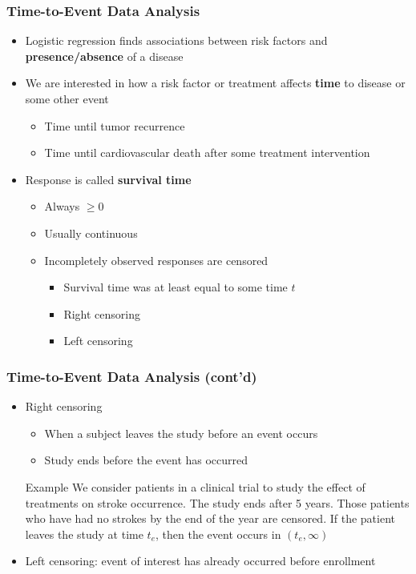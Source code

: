 \documentclass[usenames,dvipsnames]{beamer}
\begin{document}
\begin{frame}
  \frametitle{Time-to-Event Data Analysis}
  \begin{itemize}
    \item Logistic regression finds associations between risk factors and
    \textbf{presence/absence} of a disease
    \item We are interested in how a risk factor or treatment affects
    \textbf{time} to disease or some other event
    \begin{itemize}
      \item Time until tumor recurrence
      \item Time  until  cardiovascular  death  after  some  treatment intervention
    \end{itemize}
    \item Response is called \textbf{survival time}
    \begin{itemize}
      \item Always $\geq 0$
      \item Usually continuous
      \item Incompletely observed responses are censored
      \begin{itemize}
        \item Survival time was at least equal to some time $t$
        \item Right censoring
        \item Left censoring
      \end{itemize}
    \end{itemize}
  \end{itemize}
\end{frame}
\begin{frame}
  \frametitle{Time-to-Event Data Analysis (cont'd)}
  \begin{itemize}
    \item Right censoring
    \begin{itemize}
      \item When a subject leaves the study before an event occurs
      \item Study ends before the event has occurred
    \end{itemize}
  \begin{block}{Example}
    We consider patients in a clinical trial to study the effect of treatments on
    stroke occurrence. The study ends after 5 years. Those patients who have had
    no strokes by the end of the year are censored. If the patient leaves the
    study at time $t_{e}$, then the event occurs in $(t_{e},\infty)$
  \end{block}
  \item Left censoring: event of interest has already occurred before
  enrollment
\end{itemize}
\end{frame}
\end{document}
